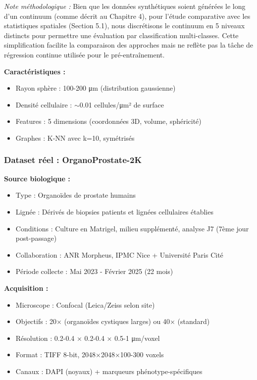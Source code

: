 \textit{Note méthodologique :} Bien que les données synthétiques soient générées le long d'un continuum (comme décrit au Chapitre 4), pour l'étude comparative avec les statistiques spatiales (Section 5.1), nous discrétisons le continuum en 5 niveaux distincts pour permettre une évaluation par classification multi-classes. Cette simplification facilite la comparaison des approches mais ne reflète pas la tâche de régression continue utilisée pour le pré-entraînement.

\textbf{Caractéristiques :}
\begin{itemize}
    \item Rayon sphère : 100-200 μm (distribution gaussienne)
    \item Densité cellulaire : $\sim$0.01 cellules/μm² de surface
    \item Features : 5 dimensions (coordonnées 3D, volume, sphéricité)
    \item Graphes : K-NN avec k=10, symétrisés
\end{itemize}

\subsubsection{Dataset réel : OrganoProstate-2K}

\textbf{Source biologique :}
\begin{itemize}
    \item Type : Organoïdes de prostate humains
    \item Lignée : Dérivés de biopsies patients et lignées cellulaires établies
    \item Conditions : Culture en Matrigel, milieu supplémenté, analyse J7 (7ème jour post-passage)
    \item Collaboration : ANR Morpheus, IPMC Nice + Université Paris Cité
    \item Période collecte : Mai 2023 - Février 2025 (22 mois)
\end{itemize}

\textbf{Acquisition :}
\begin{itemize}
    \item Microscope : Confocal (Leica/Zeiss selon site)
    \item Objectifs : 20× (organoïdes cystiques larges) ou 40× (standard)
    \item Résolution : 0.2-0.4 × 0.2-0.4 × 0.5-1 μm/voxel
    \item Format : TIFF 8-bit, 2048×2048×100-300 voxels
    \item Canaux : DAPI (noyaux) + marqueurs phénotype-spécifiques
\end{itemize}

